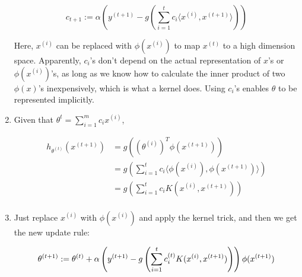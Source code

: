 \begin{answer}
\begin{enumerate}
		$$
		c_{t + 1} := \alpha\left(y^{(t + 1)} - g\left(\sum_{i = 1}^t c_i \langle x^{(i)}, x^{(t + 1)}\rangle\right)\right)
		$$
		
		Here, $x^{(i)}$ can be replaced with $\phi(x^{(i)})$ to map $x^{(t)}$ to a high dimension space. Apparently, $c_i$'s don't depend on the actual representation of $x$'s or $\phi(x^{(i)})$'s, as long as we know how to calculate the inner product of two $\phi(x)$'s inexpensively, which is what a kernel does. Using $c_i$'s enables $\theta$ to be represented implicitly.
		
		
		
		\item 
		
		Given that $\theta^{t} = \sum_{i = 1}^m c_i x^{(i)}$,
		
		$$
		\begin{aligned}
			h_{\theta^{(t)}}(x^{(t + 1)}) & = g\left((\theta^{(i)})^T \phi(x^{(t + 1)})\right)\\
			& = g\left(\sum_{i = 1}^t c_i \langle \phi(x^{(i)}), \phi(x^{(t + 1)})\rangle\right)\\
			& = g\left(\sum_{i = 1}^t c_i K(x^{(i)}, x^{(t + 1)})\right)\\
		\end{aligned}
		$$
		
		
		
		\item 
		
		Just replace $x^{(i)}$ with $\phi(x^{(i)})$ and apply the kernel trick, and then we get the new update rule:
		
		$$
		\theta^{(t+1)} := \theta^{(t)} + \alpha \left(y^{(t + 1)} - g\left(\sum_{i = 1}^t c^{(t)}_i K(x^{(i)}, x^{(t + 1)})\right)\right) \phi(x^{(t + 1)})\\
		$$
	\end{enumerate}
\end{answer}
